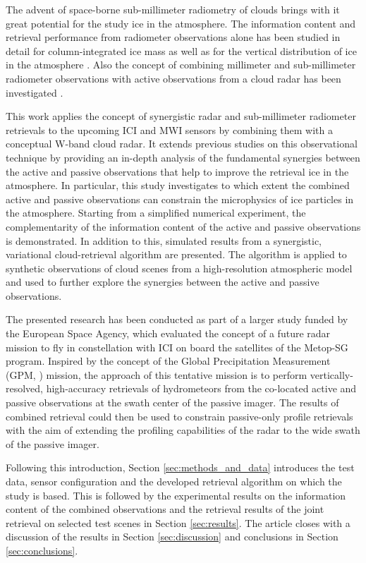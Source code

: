 \documentclass[journal abbreviation, manuscript]{copernicus}
\begin{document}
The advent of space-borne sub-millimeter radiometry of clouds brings with it
great potential for the study ice in the atmosphere. The information content and
retrieval performance from radiometer observations alone has been studied in
detail for column-integrated ice mass \citep{jimenez07, wang17, brath18a} as
well as for the vertical distribution of ice in the atmosphere \citep{birman17, grutzun18,
  aires19}. Also the concept of combining millimeter and sub-millimeter
radiometer observations with active observations from a cloud radar has been
investigated \citep{evans05, jiang19}.

This work applies the concept of synergistic radar and sub-millimeter radiometer
retrievals to the upcoming ICI and MWI sensors by combining them with a
conceptual W-band cloud radar. It extends previous studies on this observational
technique by providing an in-depth analysis of the fundamental synergies between
the active and passive observations that help to improve the retrieval ice in
the atmosphere. In particular, this study investigates to which extent the
combined active and passive observations can constrain the microphysics of ice
particles in the atmosphere. Starting from a simplified numerical experiment,
the complementarity of the information content of the active and passive
observations is demonstrated. In addition to this, simulated results from a
synergistic, variational cloud-retrieval algorithm are presented. The algorithm
is applied to synthetic observations of cloud scenes from a high-resolution
atmospheric model and used to further explore the synergies between the active
and passive observations.

The presented research has been conducted as part of a larger study funded by
the European Space Agency, which evaluated the concept of a future radar mission
to fly in constellation with ICI on board the satellites of the Metop-SG
program. Inspired by the concept of the Global Precipitation Measurement (GPM,
\cite{hou14}) mission, the approach of this tentative mission is to perform
vertically-resolved, high-accuracy retrievals of hydrometeors from the
co-located active and passive observations at the swath center of the passive
imager. The results of combined retrieval could then be used to constrain
passive-only profile retrievals with the aim of extending the profiling
capabilities of the radar to the wide swath of the passive imager.

Following this introduction, Section \ref{sec:methods_and_data} introduces the
test data, sensor configuration and the developed retrieval algorithm on which
the study is based. This is followed by the experimental results on the
information content of the combined observations and the retrieval results of
the joint retrieval on selected test scenes in Section \ref{sec:results}. The
article closes with a discussion of the results in Section \ref{sec:discussion}
and conclusions in Section \ref{sec:conclusions}.
\end{document}
